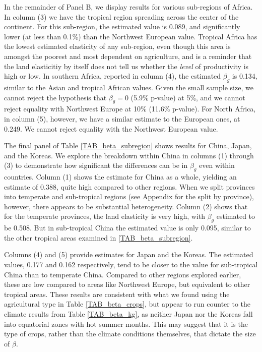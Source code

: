In the remainder of Panel B, we display results for various sub-regions of Africa. In column (3) we have the tropical region spreading across the center of the continent. For this sub-region, the estimated value is 0.089, and significantly lower (at less than 0.1\%) than the Northwest European value. Tropical Africa has the lowest estimated elasticity of any sub-region, even though this area is amongst the poorest and most dependent on agriculture, and is a reminder that the land elasticitiy by itself does not tell us whether the \textit{level} of productivity is high or low. In southern Africa, reported in column (4), the estimated $\beta_g$ is 0.134, similar to the Asian and tropical African values. Given the small sample size, we cannot reject the hypothesis that $\beta_g=0$ (5.9\% p-value) at 5\%, and we cannot reject equality with Northwest Europe at 10\% (11.6\% p-value). For North Africa, in column (5), however, we have a similar estimate to the European ones, at 0.249. We cannot reject equality with the Northwest European value.

The final panel of Table \ref{TAB_beta_subregion} shows results for China, Japan, and the Koreas. We explore the breakdown within China in columns (1) through (3) to demonstrate how significant the differences can be in $\beta_g$ even within countries. Column (1) shows the estimate for China as a whole, yielding an estimate of 0.388, quite high compared to other regions. When we split provinces into temperate and sub-tropical regions (see Appendix for the split by province), however, there appears to be substantial heterogeneity. Column (2) shows that for the temperate provinces, the land elasticity is very high, with $\beta_g$ estimated to be 0.508. But in sub-tropical China the estimated value is only 0.095, similar to the other tropical areas examined in \ref{TAB_beta_subregion}.

Columns (4) and (5) provide estimates for Japan and the Koreas. The estimated values, 0.177 and 0.162 respectively, tend to be closer to the value for sub-tropical China than to temperate China. Compared to other regions explored earlier, these are low compared to areas like Northwest Europe, but equivalent to other tropical areas. These results are consistent with what we found using the agricultural type in Table \ref{TAB_beta_crops}, but appear to run counter to the climate results from Table \ref{TAB_beta_kg}, as neither Japan nor the Koreas fall into equatorial zones with hot summer months. This may suggest that it is the type of crops, rather than the climate conditions themselves, that dictate the size of $\beta$.

